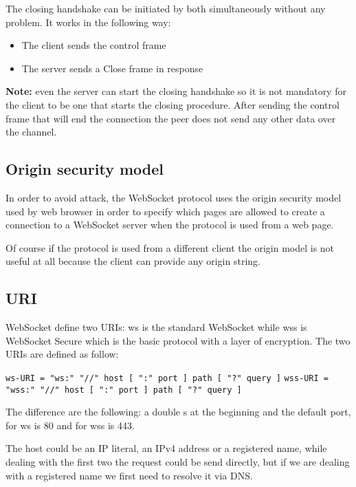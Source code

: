 The closing handshake can be initiated by both simultaneously without any problem.\newline
It works in the following way:
\begin{itemize}
	\item The client sends the control frame
	\item The server sends a Close frame in response
\end{itemize}

\textbf{Note:} even the server can start the closing handshake so it is not mandatory for the client to be one that starts the closing procedure.\newline
After sending the control frame that will end the connection the peer does not send any other data over the channel.

\subsection{Origin security model}
In order to avoid attack, the WebSocket protocol uses the origin security model used by web browser in order
to specify which pages are allowed to create a connection to a WebSocket server when the protocol is used from a web page.\newline

Of course if the protocol is used from a different client the origin model is not useful at all because the client can provide any origin string.

\subsection{URI}
WebSocket define two URIs: ws is the standard WebSocket while wss is WebSocket Secure which is the basic protocol with a layer of encryption.\newline
The two URIs are defined as follow:\newline

\texttt{ws-URI = "ws:" "//" host [ ":" port ] path [ "?" query ]}\newline
\texttt{wss-URI = "wss:" "//" host [ ":" port ] path [ "?" query ]}\newline

The difference are the following: a double s at the beginning and the default port, for ws is 80 and for wss is 443.\newline

The host could be an IP literal, an IPv4 address or a registered name, while dealing with the first two the request could be send directly, but if we are dealing with a registered name we first need to resolve it via DNS.\newline

